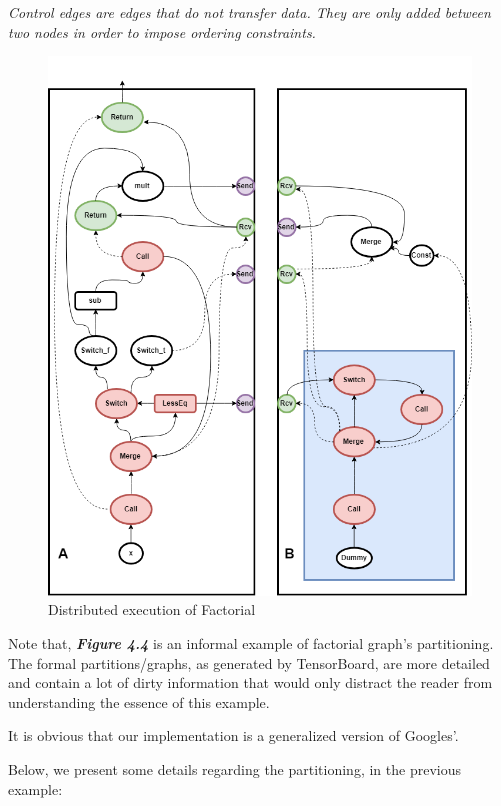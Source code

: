 \documentclass[ack,preface]{dithesis}
\begin{document}
\textit{Control edges are edges that do not transfer data. They are only added between two nodes in order to impose ordering constraints.}

\begin{figure}
\centering
\includegraphics[scale=0.6]{figures/DistrFac}
\caption{Distributed execution of Factorial}
\end{figure}

Note that, \textit{\textbf{Figure 4.4}} is an informal example of factorial graph's partitioning. The formal partitions/graphs, as generated by TensorBoard, are more detailed and contain a lot of dirty information that would only distract the reader from understanding the essence of this example. 

It is obvious that our implementation is a generalized version of Googles'. 

Below, we present some details regarding the partitioning, in the previous example:
    
\end{document}

